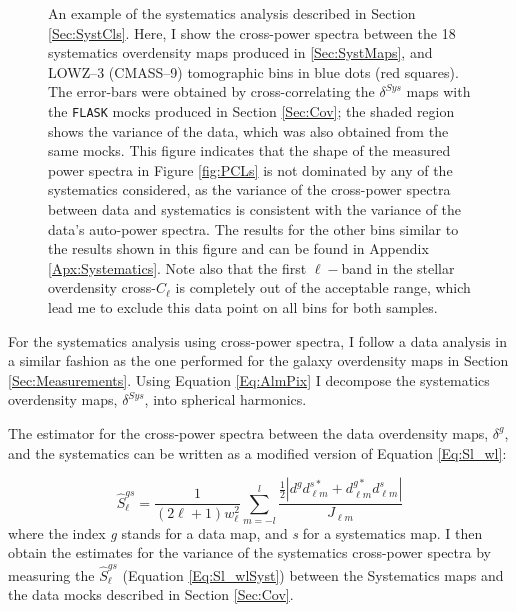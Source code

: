 \begin{figure}
\begin{center}
\caption[An example of the systematics analysis for the BOSS samples.]{An example of the systematics analysis described in Section \ref{Sec:SystCls}. Here, I show the cross-power spectra between the 18 systematics overdensity maps produced in \ref{Sec:SystMaps}, and LOWZ--3 (CMASS--9) tomographic bins in blue dots (red squares). The error-bars were obtained by cross-correlating the $\delta^{Sys}$ maps with the \texttt{FLASK} mocks produced in Section \ref{Sec:Cov}; the shaded region shows the variance of the data, which was also obtained from the same mocks. This figure indicates that the shape of the measured power spectra in Figure \ref{fig:PCLs} is not dominated by any of the systematics considered, as the variance of the cross-power spectra between data and systematics is consistent with the variance of the data's auto-power spectra. The results for the other bins similar to the results shown in this figure and can be found in Appendix \ref{Apx:Systematics}. Note also that the first $\ell-$band in the stellar overdensity cross-$C_{\ell}$ is completely out of the acceptable range, which lead me to exclude this data point on all bins for both samples.}
\label{fig:SystBin3}
\end{center}
\end{figure}
For the systematics analysis using cross-power spectra, I follow a data analysis in a similar fashion as the one performed for the galaxy overdensity maps in Section \ref{Sec:Measurements}.  Using Equation \eqref{Eq:AlmPix} I decompose the systematics overdensity maps, $\delta^{Sys}$, into spherical harmonics. 

The estimator for the cross-power spectra between the data overdensity maps, $\delta^{g}$, and the systematics can be written as a modified version of Equation \eqref{Eq:Sl_wl}:

\begin{equation}
\hat{S}^{gs}_{\ell} = \frac{1}{(2\ell+1)w_{\ell}^2}\sum_{m=-l}^l  \frac{\frac{1}{2}\left|d_{}^{g}  d_{\ell m}^{s*} + d_{\ell m}^{g*}  d_{\ell m}^{s}\right|}{J_{\ell m}}
\label{Eq:Sl_wlSyst}
\end{equation}
where the index \textit{g} stands for a data map, and \textit{s} for a systematics map. I then obtain the estimates for the variance of the systematics cross-power spectra by measuring the $\hat{S}^{gs}_{\ell}$ (Equation \eqref{Eq:Sl_wlSyst}) between the Systematics maps and the data mocks described in Section \ref{Sec:Cov}.

